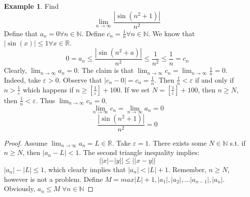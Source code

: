 \documentclass[a4paper, notitlepage]{report}
\newcommand{\dlim}{\displaystyle\lim}
\theoremstyle{remark}
\theoremstyle{definition}
\newtheorem{example}{Example}
\begin{document}
	    \begin{example}
	    Find \[\lim_{n\rightarrow \infty} \frac{|\sin (n^2 + 1)|}{n^2}\]
            Define that \(a_n = 0 \forall n\in\mathbb{N}\). Define \(c_n = \frac{1}{n} \forall n \in \mathbb{N}\). We know that \(|\sin(x)| \leq 1 \forall x \in \mathbb{R}\).
            \[0 = a_n \leq \frac{|\sin(n^2+a)|}{n^2} \leq \frac{1}{n^2} \leq \frac{1}{n} = c_n\]
            Clearly, \(\dlim_{n\rightarrow \infty} a_n = 0\). The claim is that
	    \(\dlim_{n\to\infty} c_n = \lim_{n\to\infty} \frac{1}{n} = 0\).
            Indeed, take \(\varepsilon > 0\). Observe that \(|c_n - 0| = c_n
	    = \frac{1}{n}\). Then \(\frac{1}{n} < \varepsilon\) if and only if \(n>\frac{1}{\varepsilon}\)
            which happens if \(n \geq [\frac{1}{\varepsilon}] + 100\). If we set \(N = [\frac{1}{\varepsilon}] + 100\), then \(n\geq N\), then \(\frac{1}{n} < \varepsilon \). Thus \(\dlim_{n\to\infty}c_n = 0\).
            \[\lim_{n\to\infty} c_n = \lim_{n\to\infty} a_n = 0\]
            \[\frac{|\sin(n^2 + 1)|}{n^2} = 0\]
	    \end{example}
            \begin{proof}
                Assume \(\dlim_{n\to\infty} a_n = L \in \mathbb{R}\). Take \(\varepsilon = 1\). There exists some \(N \in \mathbb{N}\) s.t. if \(n \geq N\), then \(|a_n - L| < 1 \). The second triangle inequality implies:
                \[||x| - |y|| \leq ||x-y||\]
                \(|a_n| - |L| \leq 1 \), which clearly implies that
		\(|a_n|<|L|+1\). Remember, \(n\geq N\), however is not a problem. Define \(M = max{|L| + 1, |a_1|, |a_2|, ... |a_{n-1}|, |a_n|}\). Obviously, 
                \(a_n \leq M \; \forall n\in \mathbb{N}\)
            \end{proof}
\end{document}

